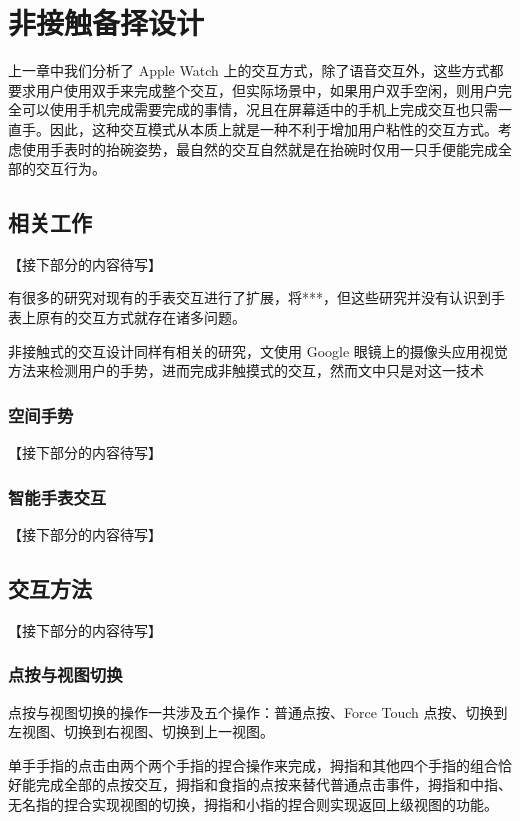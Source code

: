 \chapter{非接触备择设计}

\quad\quad 上一章中我们分析了 Apple Watch 上的交互方式，除了语音交互外，这些方式都要求用户使用双手来完成整个交互，但实际场景中，如果用户双手空闲，则用户完全可以使用手机完成需要完成的事情，况且在屏幕适中的手机上完成交互也只需一直手。因此，这种交互模式从本质上就是一种不利于增加用户粘性的交互方式。考虑使用手表时的抬碗姿势，最自然的交互自然就是在抬碗时仅用一只手便能完成全部的交互行为。

\section{相关工作}

【接下部分的内容待写】

有很多的研究对现有的手表交互进行了扩展，将***，但这些研究并没有认识到手表上原有的交互方式就存在诸多问题。

非接触式的交互设计同样有相关的研究，文\cite{lv2015extending}使用 Google 眼镜上的摄像头应用视觉方法来检测用户的手势，进而完成非触摸式的交互，然而文中只是对这一技术

\subsection{空间手势}

【接下部分的内容待写】

\subsection{智能手表交互}

【接下部分的内容待写】

\section{交互方法}

【接下部分的内容待写】

\subsection{点按与视图切换}

点按与视图切换的操作一共涉及五个操作：普通点按、Force Touch 点按、切换到左视图、切换到右视图、切换到上一视图。

单手手指的点击由两个两个手指的捏合操作来完成，拇指和其他四个手指的组合恰好能完成全部的点按交互，拇指和食指的点按来替代普通点击事件，拇指和中指、无名指的捏合实现视图的切换，拇指和小指的捏合则实现返回上级视图的功能。

